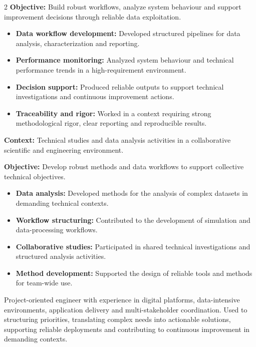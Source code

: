 \documentclass[8pt,a4paper,ragged2e,withhyper]{altacv}
\begin{document}
\begin{paracol}{2}
\textbf{Objective:} Build robust workflows, analyze system behaviour and support improvement decisions through reliable data exploitation.

\begin{itemize}
\item \textbf{Data workflow development:} Developed structured pipelines for data analysis, characterization and reporting.
\item \textbf{Performance monitoring:} Analyzed system behaviour and technical performance trends in a high-requirement environment.
\item \textbf{Decision support:} Produced reliable outputs to support technical investigations and continuous improvement actions.
\item \textbf{Traceability and rigor:} Worked in a context requiring strong methodological rigor, clear reporting and reproducible results.
\end{itemize}

\divider


\textbf{Context:} Technical studies and data analysis activities in a collaborative scientific and engineering environment.

\textbf{Objective:} Develop robust methods and data workflows to support collective technical objectives.

\begin{itemize}
\item \textbf{Data analysis:} Developed methods for the analysis of complex datasets in demanding technical contexts.
\item \textbf{Workflow structuring:} Contributed to the development of simulation and data-processing workflows.
\item \textbf{Collaborative studies:} Participated in shared technical investigations and structured analysis activities.
\item \textbf{Method development:} Supported the design of reliable tools and methods for team-wide use.
\end{itemize}

\switchcolumn


Project-oriented engineer with experience in digital platforms, data-intensive environments, application delivery and multi-stakeholder coordination. Used to structuring priorities, translating complex needs into actionable solutions, supporting reliable deployments and contributing to continuous improvement in demanding contexts.


\end{paracol}
\end{document}
